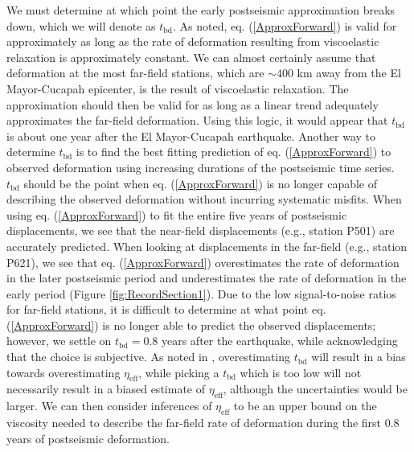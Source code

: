 \documentclass[draft,linenumbers]{AGUJournal}
\begin{document}
We must determine at which point the early postseismic approximation breaks down, which we will denote as $t_{\mathrm{bd}}$.  As noted, eq. (\ref{ApproxForward}) is valid for approximately as long as the rate of deformation resulting from viscoelastic relaxation is approximately constant. We can almost certainly assume that deformation at the most far-field stations, which are ${\sim}400$ km away from the El Mayor-Cucapah epicenter, is the result of viscoelastic relaxation. The approximation should then be valid for as long as a linear trend adequately approximates the far-field deformation. Using this logic, it would appear that $t_{\mathrm{bd}}$ is about one year after the El Mayor-Cucapah earthquake.  Another way to determine $t_{\mathrm{bd}}$ is to find the best fitting prediction of eq. (\ref{ApproxForward}) to observed deformation using increasing durations of the postseismic time series.  $t_\mathrm{bd}$ should be the point when eq. (\ref{ApproxForward}) is no longer capable of describing the observed deformation without incurring systematic misfits.  When using eq. (\ref{ApproxForward}) to fit the entire five years of postseismic displacements, we see that the near-field displacements (e.g., station P501) are accurately predicted. When looking at displacements in the far-field (e.g., station P621), we see that eq. (\ref{ApproxForward}) overestimates the rate of deformation in the later postseismic period and underestimates the rate of deformation in the early period (Figure \ref{fig:RecordSection1}).  Due to the low signal-to-noise ratios for far-field stations, it is difficult to determine at what point eq. (\ref{ApproxForward}) is no longer able to predict the observed displacements; however, we settle on $t_{\mathrm{bd}}=0.8$ years after the earthquake, while acknowledging that the choice is subjective. As noted in \citet{Hines2016}, overestimating $t_{\mathrm{bd}}$ will result in a bias towards overestimating $\eta_{\mathrm{eff}}$, while picking a $t_\mathrm{bd}$ which is too low will not necessarily result in a biased estimate of $\eta_\mathrm{eff}$, although the uncertainties would be larger. We can then consider inferences of $\eta_{\mathrm{eff}}$ to be an upper bound on the viscosity needed to describe the far-field rate of deformation during the first 0.8 years of postseismic deformation. 
\end{document}
